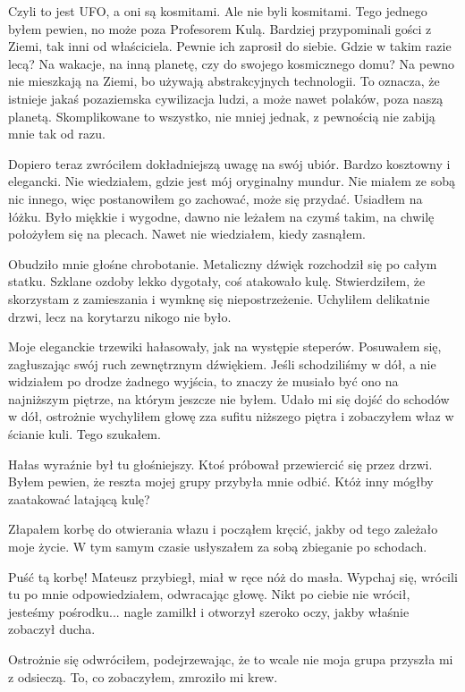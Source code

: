 Czyli to jest UFO, a oni są kosmitami.
Ale nie byli kosmitami. Tego jednego byłem pewien, no może poza Profesorem Kulą.
Bardziej przypominali gości z Ziemi, tak inni od właściciela. Pewnie ich zaprosił do siebie.
Gdzie w takim razie lecą?
Na wakacje, na inną planetę, czy do swojego kosmicznego domu?
Na pewno nie mieszkają na Ziemi, bo używają abstrakcyjnych technologii.
To oznacza, że istnieje jakaś pozaziemska cywilizacja ludzi, a może nawet polaków, poza naszą planetą.
Skomplikowane to wszystko, nie mniej jednak, z pewnością nie zabiją mnie tak od razu.

Dopiero teraz zwróciłem dokładniejszą uwagę na swój ubiór.
Bardzo kosztowny i elegancki. Nie wiedziałem, gdzie jest mój oryginalny mundur. 
Nie miałem ze sobą nic innego, więc postanowiłem go zachować, może się przydać.
Usiadłem na łóżku. Było miękkie i wygodne, dawno nie leżałem na czymś takim, na chwilę położyłem się na plecach.
Nawet nie wiedziałem, kiedy zasnąłem.

Obudziło mnie głośne chrobotanie. Metaliczny dźwięk rozchodził się po całym statku.
Szklane ozdoby lekko dygotały, coś atakowało kulę.
Stwierdziłem, że skorzystam z zamieszania i wymknę się niepostrzeżenie.
Uchyliłem delikatnie drzwi, lecz na korytarzu nikogo nie było.

Moje eleganckie trzewiki hałasowały, jak na występie steperów.
Posuwałem się, zagłuszając swój ruch zewnętrznym dźwiękiem.
Jeśli schodziliśmy w dół, a nie widziałem po drodze żadnego wyjścia, to znaczy że musiało być ono na najniższym piętrze, na którym jeszcze nie byłem.
Udało mi się dojść do schodów w dół, ostrożnie wychyliłem głowę zza sufitu niższego piętra i zobaczyłem właz w ścianie kuli.
Tego szukałem.

Hałas wyraźnie był tu głośniejszy. Ktoś próbował przewiercić się przez drzwi.
Byłem pewien, że reszta mojej grupy przybyła mnie odbić.
Któż inny mógłby zaatakować latającą kulę?

Złapałem korbę do otwierania włazu i począłem kręcić, jakby od tego zależało moje życie.
W tym samym czasie usłyszałem za sobą zbieganie po schodach.
\begin{dialogue}
\ds{} Puść tą korbę! \dm{} Mateusz przybiegł, miał w ręce nóż do masła.
\ds{} Wypchaj się, wrócili tu po mnie \dm{} odpowiedziałem, odwracając głowę.
\ds{} Nikt po ciebie nie wrócił, jesteśmy pośrodku... \dm{} nagle zamilkł i otworzył szeroko oczy, jakby właśnie zobaczył ducha.
\end{dialogue}
Ostrożnie się odwróciłem, podejrzewając, że to wcale nie moja grupa przyszła mi z odsieczą.
To, co zobaczyłem, zmroziło mi krew.

